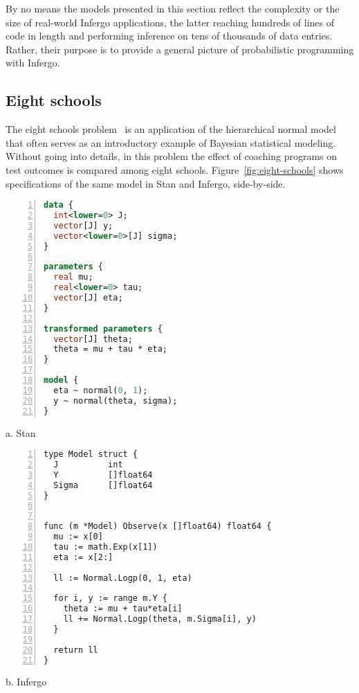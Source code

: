 \documentclass[sigplan,review,10pt,anonymous]{acmart}
\begin{document}
\begin{sloppypar}
By no means the models presented in this section reflect the
complexity or the size of real-world Infergo applications, the
latter reaching hundreds of lines of code in length and
performing inference on tens of thousands of data entries.
Rather, their purpose is to provide a general picture of
probabilistic programming with Infergo.

\subsection{Eight schools}
\label{sec:eight-schools}

The eight schools problem~\cite{GCS+03} is an application of
the hierarchical normal model that often serves as an introductory
example of Bayesian statistical modeling. Without going into
details, in this problem the effect of coaching programs on test
outcomes is compared among eight schools.
Figure~\ref{fig:eight-schools} shows specifications of the same
model in Stan and Infergo, side-by-side.
\begin{figure*}
  \begin{minipage}{0.45\textwidth}
  \begin{lstlisting}[language=Stan,framexleftmargin=10pt,numbers=left]
data {
  int<lower=0> J;
  vector[J] y;
  vector<lower=0>[J] sigma;
}

parameters {
  real mu;
  real<lower=0> tau;
  vector[J] eta;
}

transformed parameters {
  vector[J] theta;
  theta = mu + tau * eta;
}

model {
  eta ~ normal(0, 1);
  y ~ normal(theta, sigma);
}
\end{lstlisting}

\centering
a. Stan
  \end{minipage}
  \hfill
  \begin{minipage}{0.45\textwidth}
\begin{lstlisting}[framexleftmargin=10pt,numbers=left]
type Model struct {
  J          int
  Y          []float64
  Sigma      []float64
}


func (m *Model) Observe(x []float64) float64 {
  mu := x[0]
  tau := math.Exp(x[1])
  eta := x[2:]

  ll := Normal.Logp(0, 1, eta)

  for i, y := range m.Y {
    theta := mu + tau*eta[i]
    ll += Normal.Logp(theta, m.Sigma[i], y)
  }

  return ll
}
\end{lstlisting}
\centering
b. Infergo
  \end{minipage}
  \caption{Eight schools: Stan vs. Infergo. The Go implementation
  has a similar length and structure to the Stan model.}
  \label{fig:eight-schools}
\end{figure*}


\end{sloppypar}
\end{document}
